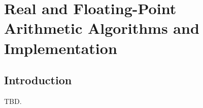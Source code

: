 \chapter{Real and Floating-Point Arithmetic Algorithms and Implementation}        
\label{craa0}

\section{Introduction}
\label{craa0:sint0}

TBD.


